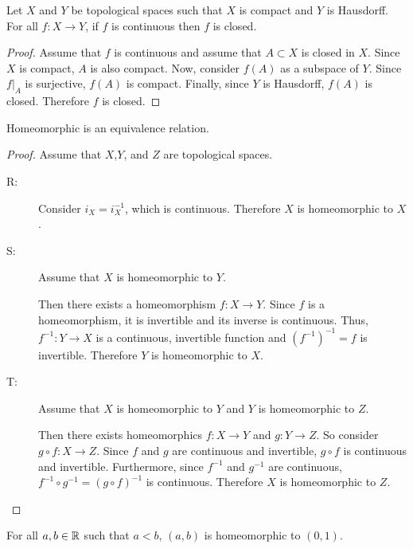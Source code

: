 \documentclass[letterpaper,12pt,fleqn]{article}
\begin{document}
\begin{theorem}[7.24]
  Let \(X\) and \(Y\) be topological spaces such that \(X\) is compact and \(Y\) is Hausdorff.  For all \(f:X\to Y\),
  if \(f\) is continuous then \(f\) is closed.
\end{theorem}

\begin{proof}
  Assume that \(f\) is continuous and assume that \(A\subset X\) is closed in \(X\).  Since \(X\) is compact,
  \(A\) is also compact.  Now, consider \(f(A)\) as a subspace of \(Y\).  Since \(f|_A\) is surjective, \(f(A)\)
  is compact.  Finally, since \(Y\) is Hausdorff, \(f(A)\) is closed.  Therefore \(f\) is closed.
\end{proof}

\begin{theorem}[7.26]
  Homeomorphic is an equivalence relation.
\end{theorem}

\begin{proof}
  Assume that \(X\),\(Y\), and \(Z\) are topological spaces.
  \begin{description}
  \item[R:] Consider \(i_X=i_X^{-1}\), which is continuous.  Therefore \(X\) is homeomorphic to \(X\).

  \item[S:] Assume that \(X\) is homeomorphic to \(Y\).

    Then there exists a homeomorphism \(f:X\to Y\).  Since \(f\) is a homeomorphism, it is invertible and its
    inverse is continuous. Thus, \(f^{-1}:Y\to X\) is a continuous, invertible function and \((f^{-1})^{-1}=f\) is
    invertible.  Therefore \(Y\) is homeomorphic to \(X\).

  \item[T:] Assume that \(X\) is homeomorphic to \(Y\) and \(Y\) is homeomorphic to \(Z\).

    Then there exists homeomorphics \(f:X\to Y\) and \(g:Y\to Z\).  So consider \(g\circ f:X\to Z\).  Since \(f\)
    and \(g\) are continuous and invertible, \(g\circ f\) is continuous and invertible.  Furthermore, since
    \(f^{-1}\) and \(g^{-1}\) are continuous, \(f^{-1}\circ g^{-1}=(g\circ f)^{-1}\) is continuous.  Therefore
    \(X\) is homeomorphic to \(Z\).
  \end{description}
\end{proof}

\begin{lemma}
  For all \(a,b\in\mathbb{R}\) such that \(a<b\), \((a,b)\) is homeomorphic to \((0,1)\).
\end{lemma}
\end{document}
